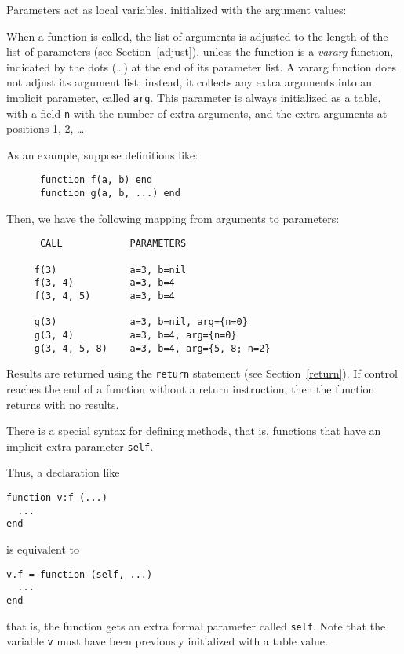 \documentclass[11pt]{article}
\newcommand{\See}[1]{Section~\ref{#1}}
\newcommand{\see}[1]{(see \See{#1})}
\newcommand{\T}[1]{{\tt #1}}
\newcommand{\Index}[1]{#1\index{#1}}
\newcommand{\IndexVerb}[1]{\T{#1}\index{#1}}
\newcommand{\Def}[1]{\emph{#1}\index{#1}}
\begin{document}
Parameters act as local variables,
initialized with the argument values:
\begin{Produc}
\end{Produc}
\label{vararg}
When a function is called,
the list of \Index{arguments} is adjusted to
the length of the list of parameters \see{adjust},
unless the function is a \Def{vararg} function,
indicated by the dots (\ldots) at the end of its parameter list.
A vararg function does not adjust its argument list;
instead, it collects any extra arguments into an implicit parameter,
called \IndexVerb{arg}.
This parameter is always initialized as a table,
with a field \verb|n| with the number of extra arguments,
and the extra arguments at positions 1, 2, \ldots

As an example, suppose definitions like:
\begin{verbatim}
      function f(a, b) end
      function g(a, b, ...) end
\end{verbatim}
Then, we have the following mapping from arguments to parameters:
\begin{verbatim}
      CALL            PARAMETERS

     f(3)             a=3, b=nil
     f(3, 4)          a=3, b=4
     f(3, 4, 5)       a=3, b=4

     g(3)             a=3, b=nil, arg={n=0}
     g(3, 4)          a=3, b=4, arg={n=0}
     g(3, 4, 5, 8)    a=3, b=4, arg={5, 8; n=2}
\end{verbatim}

Results are returned using the \verb|return| statement \see{return}.
If control reaches the end of a function without a return instruction,
then the function returns with no results.

There is a special syntax for defining \Index{methods},
that is, functions that have an implicit extra parameter \IndexVerb{self}.
\begin{Produc}
\end{Produc}%
Thus, a declaration like
\begin{verbatim}
function v:f (...)
  ...
end
\end{verbatim}
is equivalent to
\begin{verbatim}
v.f = function (self, ...)
  ...
end
\end{verbatim}
that is, the function gets an extra formal parameter called \verb|self|.
Note that the variable \verb|v| must have been
previously initialized with a table value.
\end{document}
